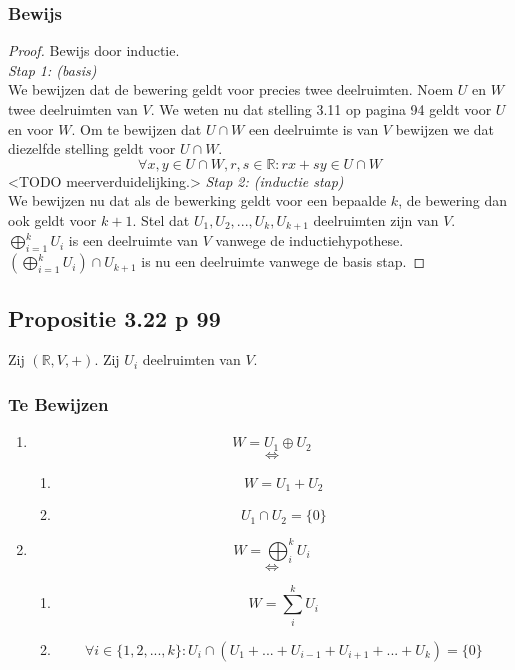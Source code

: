 \documentclass[lineaire_algebra_oplossingen.tex]{subfiles}
\begin{document}
\subsubsection*{Bewijs}
\begin{proof}
Bewijs door inductie.\\
\emph{Stap 1: (basis)}\\
We bewijzen dat de bewering geldt voor precies twee deelruimten.
Noem $U$ en $W$ twee deelruimten van $V$. We weten nu dat stelling 3.11 op pagina 94 geldt voor $U$ en voor $W$. Om te bewijzen dat $U\cap W$ een deelruimte is van $V$ bewijzen we dat diezelfde stelling geldt voor $U\cap W$.
\[
\forall x,y\in U\cap W, r,s\in \mathbb{R}: rx+sy\in U\cap W
\]
<TODO meerverduidelijking.>
\emph{Stap 2: (inductie stap)}\\
We bewijzen nu dat als de bewerking geldt voor een bepaalde $k$, de bewering dan ook geldt voor $k+1$.
Stel dat $U_1,U_2,...,U_k,U_{k+1}$ deelruimten zijn van $V$. $\bigoplus_{i=1}^k U_i$ is een deelruimte van $V$ vanwege de inductiehypothese. $(\bigoplus_{i=1}^k U_i) \cap U_{k+1}$ is nu een deelruimte vanwege de basis stap.
\end{proof}

\subsection{Propositie 3.22 p 99}
Zij $(\mathbb{R},V,+)$. Zij $U_i$ deelruimten van $V$.
\subsubsection*{Te Bewijzen}
\begin{enumerate}
\item
\[
W = U_1 \oplus U_2
\]
\[\Leftrightarrow\]
\begin{enumerate}
\item
\[
W = U_1 + U_2
\]
\item
\[
U_1\cap U_2 = \{0\}
\]
\end{enumerate}
\item
\[
W = \bigoplus_{i}^kU_i
\]
\[\Leftrightarrow\]
\begin{enumerate}
\item
\[
W = \sum_i^k U_i
\]
\item
\[
\forall i \in \{1,2,...,k\}: U_i \cap (U_1+...+U_{i-1}+U_{i+1}+...+U_k)=\{0\}
\]
\end{enumerate}
\end{enumerate}
\end{document}
